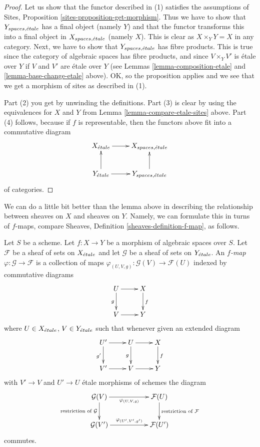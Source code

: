 \begin{proof}
Let us show that the functor described in (1) satisfies the assumptions
of Sites, Proposition \ref{sites-proposition-get-morphism}.
Thus we have to show that
$Y_{spaces, {\acute{e}tale}}$ has a final object (namely $Y$) and that
the functor transforms this into a final object in $X_{spaces, {\acute{e}tale}}$
(namely $X$). This is clear as $X \times_Y Y = X$ in any category.
Next, we have to show that $Y_{spaces, {\acute{e}tale}}$ has fibre products.
This is true since the category of algebraic spaces has fibre products,
and since $V \times_Y V'$ is \'etale over $Y$ if $V$ and $V'$ are \'etale
over $Y$ (see Lemmas \ref{lemma-composition-etale} and
\ref{lemma-base-change-etale} above).
OK, so the proposition applies and we see that we get a morphism
of sites as described in (1).

\medskip\noindent
Part (2) you get by unwinding the definitions.
Part (3) is clear by using the equivalences for $X$ and $Y$
from Lemma \ref{lemma-compare-etale-sites} above.
Part (4) follows, because if $f$ is representable, then the
functors above fit into a commutative diagram
$$
\xymatrix{
X_\etale \ar[r] &
X_{spaces, \etale} \\
Y_\etale \ar[r] \ar[u] &
Y_{spaces, \etale} \ar[u]
}
$$
of categories.
\end{proof}

\noindent
We can do a little bit better than the lemma above in describing
the relationship between sheaves on $X$ and sheaves on $Y$.
Namely, we can formulate this in turns of $f$-maps, compare
Sheaves, Definition \ref{sheaves-definition-f-map}, as follows.

\begin{definition}
\label{definition-f-map}
Let $S$ be a scheme.
Let $f : X \to Y$ be a morphism of algebraic spaces over $S$.
Let $\mathcal{F}$ be a sheaf of sets on $X_{\acute{e}tale}$ and
let $\mathcal{G}$ be a sheaf of sets on $Y_{\acute{e}tale}$.
An {\it $f$-map $\varphi : \mathcal{G} \to \mathcal{F}$}
is a collection of maps
$\varphi_{(U, V, g)} : \mathcal{G}(V) \to \mathcal{F}(U)$
indexed by commutative diagrams
$$
\xymatrix{
U \ar[d]_g \ar[r] & X \ar[d]^f \\
V \ar[r] & Y
}
$$
where $U \in X_{\acute{e}tale}$, $V \in Y_{\acute{e}tale}$ such that whenever
given an extended diagram
$$
\xymatrix{
U' \ar[r] \ar[d]_{g'} & U \ar[d]_g \ar[r] & X \ar[d]^f \\
V' \ar[r] & V \ar[r] & Y
}
$$
with $V' \to V$ and $U' \to U$ \'etale morphisms of schemes the diagram
$$
\xymatrix{
\mathcal{G}(V)
\ar[rr]_{\varphi_{(U, V, g)}}
\ar[d]_{\text{restriction of }\mathcal{G}} & &
\mathcal{F}(U)
\ar[d]^{\text{restriction of }\mathcal{F}} \\
\mathcal{G}(V')
\ar[rr]^{\varphi_{(U', V', g')}} & &
\mathcal{F}(U')
}
$$
commutes.
\end{definition}

